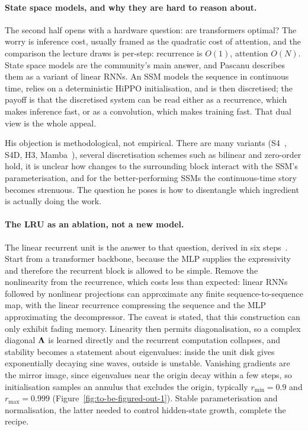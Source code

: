 \paragraph{State space models, and why they are hard to reason about.} The second half opens
with a hardware question: are transformers optimal? The worry is inference cost, usually framed
as the quadratic cost of attention, and the comparison the lecture draws is per-step: recurrence
is $O(1)$, attention $O(N)$. State space models are the community's main answer, and Pascanu
describes them as a variant of linear RNNs. An SSM models the sequence in continuous time,
relies on a deterministic HiPPO initialisation, and is then discretised; the payoff is that the
discretised system can be read either as a recurrence, which makes inference fast, or as a
convolution, which makes training fast. That dual view is the whole appeal.

His objection is methodological, not empirical. There are many variants (S4~\citep{gu2022s4},
S4D, H3, Mamba~\citep{gu2023mamba}), several discretisation schemes such as bilinear and
zero-order hold, it is unclear how changes to the surrounding block interact with the SSM's
parameterisation, and for the better-performing SSMs the continuous-time story becomes
strenuous. The question he poses is how to disentangle which ingredient is actually doing the
work.

\paragraph{The LRU as an ablation, not a new model.} The linear recurrent unit is the answer to
that question, derived in six steps~\citep{orvieto2023}. Start from a transformer backbone,
because the MLP supplies the expressivity and therefore the recurrent block is allowed to be
simple. Remove the nonlinearity from the recurrence, which costs less than expected: linear
RNNs followed by nonlinear projections can approximate any finite sequence-to-sequence map, with
the linear recurrence compressing the sequence and the MLP approximating the decompressor. The
caveat is stated, that this construction can only exhibit fading memory. Linearity then permits
diagonalisation, so a complex diagonal $\boldsymbol{\Lambda}$ is learned directly and the recurrent computation
collapses, and stability becomes a statement about eigenvalues: inside the unit disk gives
exponentially decaying sine waves, outside is unstable. Vanishing gradients are the mirror
image, since eigenvalues near the origin decay within a few steps, so initialisation samples an
annulus that excludes the origin, typically $r_{\min} = 0.9$ and $r_{\max} = 0.999$
(Figure~\ref{fig:to-be-figured-out-1}). Stable parameterisation and normalisation, the latter
needed to control hidden-state growth, complete the recipe.

